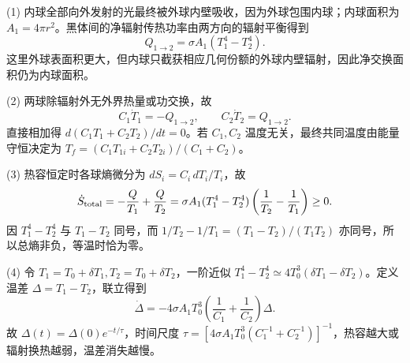 (1) 内球全部向外发射的光最终被外球内壁吸收，因为外球包围内球；内球面积为 \(A_1=4\pi r^2\)。黑体间的净辐射传热功率由两方向的辐射平衡得到
\[
Q_{1\to2}=\sigma A_1(T_1^4-T_2^4).
\]
这里外球表面积更大，但内球只截获相应几何份额的外球内壁辐射，因此净交换面积仍为内球面积。

(2) 两球除辐射外无外界热量或功交换，故
\[
C_1\dot T_1=-Q_{1\to2},\qquad
C_2\dot T_2=Q_{1\to2}.
\]
直接相加得 \(d(C_1T_1+C_2T_2)/dt=0\)。若 \(C_{1},C_{2}\) 温度无关，最终共同温度由能量守恒决定为 \(T_f=(C_1T_{1i}+C_2T_{2i})/(C_1+C_2)\)。

(3) 热容恒定时各球熵微分为 \(dS_i=C_i\,dT_i/T_i\)，故
\[
\dot S_{\rm total}=-\frac Q{T_1}+\frac Q{T_2}
=\sigma A_1(T_1^4-T_2^4)\left(\frac1{T_2}-\frac1{T_1}\right)\ge0.
\]
因 \(T_1^4-T_2^4\) 与 \(T_1-T_2\) 同号，而 \(1/T_2-1/T_1=(T_1-T_2)/(T_1T_2)\) 亦同号，所以总熵非负，等温时恰为零。

(4) 令 \(T_1=T_0+\delta T_1,T_2=T_0+\delta T_2\)，一阶近似 \(T_1^4-T_2^4\simeq4T_0^3(\delta T_1-\delta T_2)\)。定义温差 \(\Delta=T_1-T_2\)，联立得到
\[
\dot\Delta=-4\sigma A_1T_0^3\left(\frac1{C_1}+\frac1{C_2}\right)\Delta.
\]
故 \(\Delta(t)=\Delta(0)e^{-t/\tau}\)，时间尺度 \(\tau=[4\sigma A_1T_0^3(C_1^{-1}+C_2^{-1})]^{-1}\)，热容越大或辐射换热越弱，温差消失越慢。
